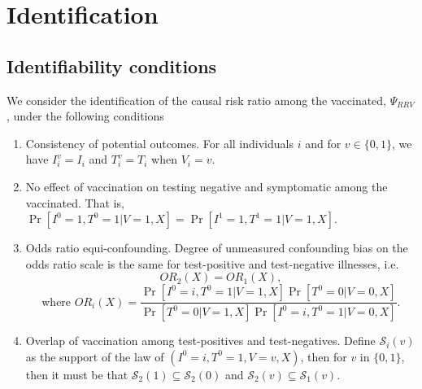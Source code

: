 \documentclass[11pt]{article}
\begin{document}

\section{Identification} \label{sec:identification}
\subsection{Identifiability conditions} \label{sec:conditions}
We consider the identification of the causal risk ratio among the vaccinated, $\Psi_{RRV}$, under the following conditions
\begin{enumerate}[label=\upshape(A\arabic*), ref=A\arabic*]
    \item\label{ass1} Consistency of potential outcomes. For all individuals $i$ and for $v \in \{0, 1\}$, we have $I_i^v = I_i$ and $T_i^v = T_i$ when $V_i = v$. 
    \item\label{ass2} No effect of vaccination on testing negative and symptomatic among the vaccinated. That is, $\Pr[I^0 = 1, T^0=1 | V = 1, X] = \Pr[I^1 = 1, T^1=1 | V = 1, X].$
    \item\label{ass3} Odds ratio equi-confounding. Degree of unmeasured confounding bias on the odds ratio scale is the same for test-positive and test-negative illnesses, i.e. 
    $$OR_2(X) = OR_1(X), $$
    $$ \text{where } OR_i(X) = \frac{\Pr[I^0 = i, T^0 = 1 | V = 1, X]\Pr[T^0 = 0 | V = 0, X]}{\Pr[T^0 = 0 | V = 1, X]\Pr[I^0 = i, T^0 = 1| V = 0, X]}.$$
    \item\label{ass4} Overlap of vaccination among test-positives and test-negatives. Define $\mathcal{S}_i(v)$ as the support of the law of $(I^0 = i, T^0 = 1, V = v, X)$, then for $v$ in $\{0,1\}$, then it must be that $\mathcal{S}_2(1) \subseteq \mathcal{S}_2(0)$ and $\mathcal{S}_2(v) \subseteq \mathcal{S}_1(v).$
\end{enumerate}
\end{document}
